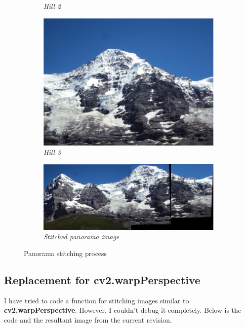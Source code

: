 \documentclass[11pt, a4paper]{article}
\begin{document}
\begin{figure}[H]
\begin{subfigure}[b]{0.3\textwidth}
		\caption{{\small \textit{Hill 2}}}
		\label{fig:h2}
	\end{subfigure}
	\hfill
		\begin{subfigure}[b]{0.3\textwidth}
		\centering
		\includegraphics[width=\textwidth]{./images/hill/3.jpg}
		\caption{{\small \textit{Hill 3}}}
		\label{fig:h3}
	\end{subfigure}
	\hfill
	\begin{subfigure}[b]{0.75\textwidth}
		\centering
		\includegraphics[width=\textwidth]{./images/panorama.jpg}
		\caption{{\small \textit{Stitched panorama image}}}
		\label{fig:pano}
	\end{subfigure}
	\caption{Panorama stitching process}
\end{figure}

\subsection{Replacement for cv2.warpPerspective}
I have tried to code a function for stitching images similar to \textbf{cv2.warpPerspective}. However, I couldn't debug it completely. Below is the code and the resultant image from the current revision.
\end{document}
